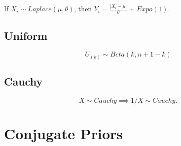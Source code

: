 \documentclass{article}
\begin{document}
If $X_i \sim Laplace(\mu, \theta)$, then $Y_i = \frac{|X_i - \mu|}{\theta} \sim Expo(1)$. 

\subsection{Uniform}
$$U_{(k)} \sim Beta(k, n+1-k)$$

\subsection{Cauchy}
$$X \sim Cauchy \implies 1/X \sim Cauchy.$$
\section{Conjugate Priors}
\end{document}
